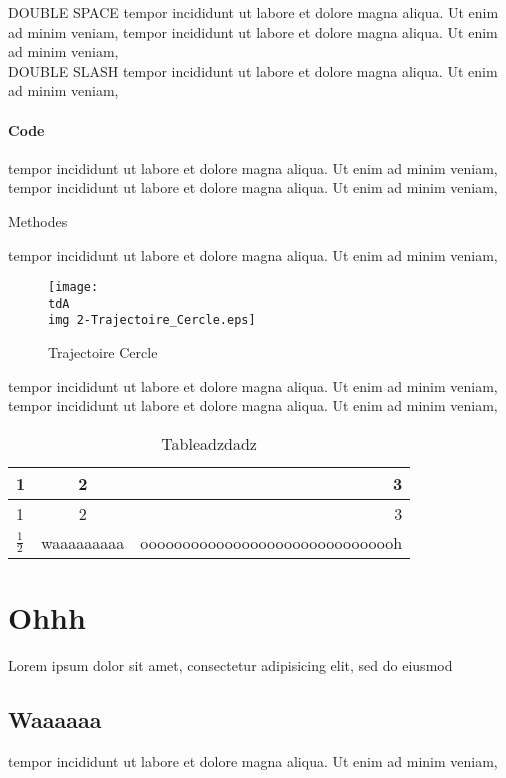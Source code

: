 			DOUBLE SPACE tempor incididunt ut labore et dolore magna aliqua. Ut enim ad minim veniam,
			tempor incididunt ut labore et dolore magna aliqua. Ut enim ad minim veniam,
			\\
			DOUBLE SLASH tempor incididunt ut labore et dolore magna aliqua. Ut enim ad minim veniam,



		\subsubsection{Code}

			tempor incididunt ut labore et dolore magna aliqua. Ut enim ad minim veniam,
			tempor incididunt ut labore et dolore magna aliqua. Ut enim ad minim veniam,

			\begin{listing}[H]
				\caption{Methodes}
			\end{listing}

			tempor incididunt ut labore et dolore magna aliqua. Ut enim ad minim veniam,

			\begin{figure}[H]
				\centering
				\texttt{[image: \\tdA\\img 2-Trajectoire\_Cercle.eps]}
				\caption{Trajectoire Cercle}
			\end{figure}

			tempor incididunt ut labore et dolore magna aliqua. Ut enim ad minim veniam,
			tempor incididunt ut labore et dolore magna aliqua. Ut enim ad minim veniam,

			\begin{table}[H]
				\centering
				\begin{tabular}{|l|c|r|}
					\hline
					1	& 2	& 3	\\	\hline
					1	& 2	& 3	\\	\hline\hline
					$\frac{1}{2}$	& waaaaaaaaa	& ooooooooooooooooooooooooooooooh	\\	\hline
				\end{tabular}
				\caption{Tableadzdadz}
			\end{table}

\chapter{Ohhh}
Lorem ipsum dolor sit amet, consectetur adipisicing elit, sed do eiusmod
\section{Waaaaaa}
	tempor incididunt ut labore et dolore magna aliqua. Ut enim ad minim veniam,

